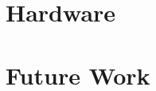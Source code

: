 \documentclass[final,12pt,twoside]{mcthesis}
\begin{document}
\newpage


\newpage


\newpage


\newpage
\chapter{Hardware}

\newpage


\newpage


\newpage
\chapter{Future Work}





\appendix
%
\label{body end}
\end{document}
